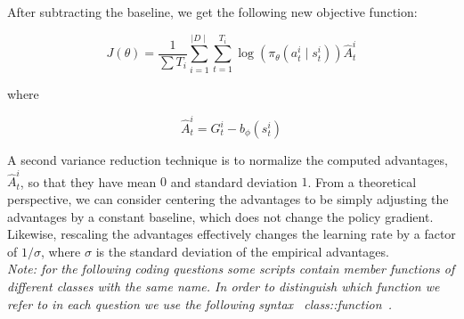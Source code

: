After subtracting the baseline, we get the following new objective function:

\[ J(\theta) = \frac{1}{\sum T_i} \sum_{i=1}^{\mid D \mid} \sum_{t=1}^{T_i} \log(\pi_\theta(a^i_t \mid s^i_t)) \hat{A}^i_t \]

where

\[\hat{A}^i_t = G^i_t - b_{\phi}(s^i_t)\]

A second variance reduction technique is to normalize the computed advantages, $\hat{A}^i_t$, so that they have mean $0$ and standard deviation $1$. From a theoretical perspective, we can consider centering the advantages to be simply adjusting the advantages by a constant baseline, which does not change the policy gradient. Likewise, rescaling the advantages effectively changes the learning rate by a factor of $1/\sigma$, where $\sigma$ is the standard deviation of the empirical advantages. \\

\textit{Note: for the following coding questions some scripts contain member functions of different classes with the same name. In order to distinguish which function we refer to in each question we use the following syntax ~class::function~.}
\clearpage


\begin{enumerate}[(a)]

	

	

	

	

	

	

	

\end{enumerate}